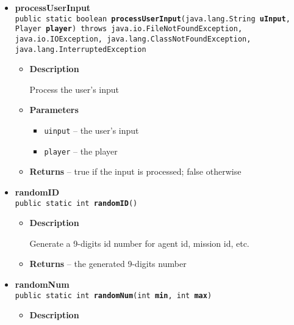 {{{\begin{itemize}
{\begin{itemize}
{Process the user's input that intends for a problem
}
\item{
{\bf  Parameters}
  \begin{itemize}
   \item{
\texttt{problem} -- the problem}
   \item{
\texttt{player} -- the player}
  \end{itemize}
}%
\item{{\bf  Returns} -- 
true if the user answers the question correctly; false if answers incorrectly or doesn't answer 
}%
\end{itemize}
}%
\item{ 
{\bf  processUserInput}\\
\texttt{public static boolean\ {\bf  processUserInput}(\texttt{java.lang.String} {\bf  uInput},
\texttt{Player} {\bf  player}) throws java.io.FileNotFoundException, java.io.IOException, java.lang.ClassNotFoundException, java.lang.InterruptedException
\label{personOfInterest.Game.processUserInput(java.lang.String, personOfInterest.Player)}}%
\begin{itemize}
\item{
{\bf  Description}

Process the user's input
}
\item{
{\bf  Parameters}
  \begin{itemize}
   \item{
\texttt{uinput} -- the user's input}
   \item{
\texttt{player} -- the player}
  \end{itemize}
}%
\item{{\bf  Returns} -- 
true if the input is processed; false otherwise 
}%
\end{itemize}
}%
\item{ 
{\bf  randomID}\\
\texttt{public static int\ {\bf  randomID}()
\label{personOfInterest.Game.randomID()}}%
\begin{itemize}
\item{
{\bf  Description}

Generate a 9-digits id number for agent id, mission id, etc.
}
\item{{\bf  Returns} -- 
the generated 9-digits number 
}%
\end{itemize}
}%
\item{ 
{\bf  randomNum}\\
\texttt{public static int\ {\bf  randomNum}(\texttt{int} {\bf  min},
\texttt{int} {\bf  max})
\label{personOfInterest.Game.randomNum(int, int)}}%
\begin{itemize}
\item{
{\bf  Description}

}
\end{itemize}}
\end{itemize}}}}
